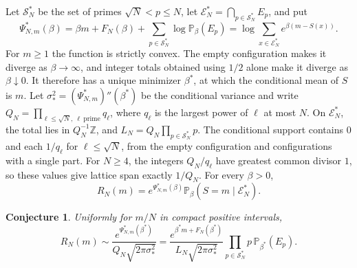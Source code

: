 \documentclass[11pt]{amsart}
\newtheorem{conjecture}[theorem]{Conjecture}
\theoremstyle{remark}
\newcommand{\Pp}{\mathbb P}
\newcommand{\Z}{\mathbb Z}
\begin{document}
Let \(\mathcal S_N^\ast\) be the set of primes \(\sqrt N<p\le N\), let
\(\mathcal E_N^\ast=\bigcap_{p\in\mathcal S_N^\ast}E_p\), and put
\[
 \Psi_{N,m}^\ast(\beta)=\beta m+F_N(\beta)+
 \sum_{p\in\mathcal S_N^\ast}\log\Pp_\beta(E_p)
 =\log\sum_{x\in\mathcal E_N^\ast}e^{\beta(m-S(x))}.
\]
For \(m\ge1\) the function is strictly convex. The empty configuration makes it diverge as \(\beta\to\infty\), and integer totals obtained using \(1/2\) alone make it diverge as \(\beta\downarrow0\). It therefore has a unique minimizer \(\beta^\ast\), at which the conditional mean of \(S\) is \(m\). Let \(\sigma_\ast^2=(\Psi_{N,m}^\ast)''(\beta^\ast)\) be the conditional variance and write \(Q_N=\prod_{\ell\le\sqrt N,\ \ell\ \mathrm{prime}}q_\ell\), where \(q_\ell\) is the largest power of \(\ell\) at most \(N\). On \(\mathcal E_N^\ast\), the total lies in \(Q_N^{-1}\Z\), and \(L_N=Q_N\prod_{p\in\mathcal S_N^\ast}p\). The conditional support
contains \(0\) and each \(1/q_\ell\) for \(\ell\le\sqrt N\), from the
empty configuration and configurations with a single part. For \(N\ge4\),
the integers \(Q_N/q_\ell\) have greatest common divisor \(1\), so
these values give lattice span exactly \(1/Q_N\).
For every \(\beta>0\),
\begin{equation}\label{eq:local-limit-identity}
 R_N(m)=e^{\Psi_{N,m}^\ast(\beta)}\Pp_\beta(S=m\mid\mathcal E_N^\ast).
\end{equation}

\begin{conjecture}\label{conj:local-limit}
Uniformly for \(m/N\) in compact positive intervals,
\begin{equation}\label{eq:local-limit-conjecture}
 R_N(m)\sim
 \frac{e^{\Psi_{N,m}^\ast(\beta^\ast)}}{Q_N\sqrt{2\pi\sigma_\ast^2}}
 =\frac{e^{\beta^\ast m+F_N(\beta^\ast)}}{L_N\sqrt{2\pi\sigma_\ast^2}}
 \prod_{p\in\mathcal S_N^\ast}p\,\Pp_{\beta^\ast}(E_p).
\end{equation}
\end{conjecture}
\end{document}
